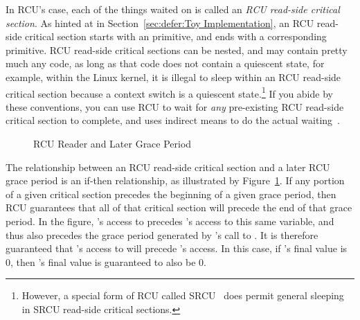 In RCU's case, each of the things waited on is called an
\emph{RCU read-side critical section}.
As hinted at in
Section~\ref{sec:defer:Toy Implementation}, an RCU read-side critical
section starts with an  primitive, and ends with a
corresponding  primitive.
RCU read-side critical sections can be nested, and may contain pretty
much any code, as long as that code does not contain a quiescent state,
for example, within the Linux kernel, it is illegal to sleep within
an RCU read-side critical section because a context switch is a quiescent
state.\footnote{
	However, a special form of RCU called SRCU~\cite{PaulEMcKenney2006c}
	does permit general sleeping in SRCU read-side critical sections.}
If you abide by these conventions, you can use RCU to wait for \emph{any}
pre-existing RCU read-side critical section to complete, and
 uses indirect means to do the actual
waiting~\cite{MathieuDesnoyers2012URCU,McKenney:2013:SDS:2483852.2483867}.

\begin{figure}[tbp]
\centering
{}
\caption{RCU Reader and Later Grace Period}
\label{fig:defer:RCU Reader and Later Grace Period}
\end{figure}

The relationship between an RCU read-side critical section and a later
RCU grace period is an if-then relationship, as illustrated by
Figure~\ref{fig:defer:RCU Reader and Later Grace Period}.
If any portion of a given critical section precedes the beginning of
a given grace period, then RCU guarantees that all of that critical
section will precede the end of that grace period.
In the figure, 's access to  precedes 's access
to this same variable, and thus also precedes the grace period generated
by 's call to .
It is therefore guaranteed that 's access to  will precede
's access.
In this case, if 's final value is 0, then 's final value
is guaranteed to also be 0.

\QuickQuizEnd

